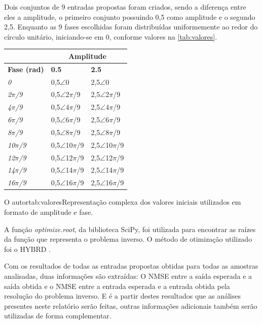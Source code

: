 Dois conjuntos de 9 entradas propostas foram criados, sendo a diferença entre eles a amplitude, o primeiro conjunto possuindo 0,5 como amplitude e o segundo 2,5. Enquanto as 9 fases escolhidas foram distribuídas uniformemente ao redor do círculo unitário, iniciando-se em 0, conforme valores na \autoref{tab:valores}.
{
\begin{tabular}{l|l|l}
\hline
    & \multicolumn{2}{c}{\textbf{Amplitude}} \\ \hline
    \textbf{Fase (rad)} & \textbf{0.5} & \textbf{2.5} \\ \hline
    \textit{0}& 0,5$\angle$0 & 2,5$\angle$0 \\ \hline
    \textit{2$\pi$/9} & 0,5$\angle$2$\pi$/9  & 2,5$\angle$2$\pi$/9  \\ \hline
    \textit{4$\pi$/9} & 0,5$\angle$4$\pi$/9  & 2,5$\angle$4$\pi$/9  \\ \hline
    \textit{6$\pi$/9} & 0,5$\angle$6$\pi$/9  & 2,5$\angle$6$\pi$/9  \\ \hline
    \textit{8$\pi$/9} & 0,5$\angle$8$\pi$/9  & 2,5$\angle$8$\pi$/9  \\ \hline
    \textit{10$\pi$/9}& 0,5$\angle$10$\pi$/9 & 2,5$\angle$10$\pi$/9 \\ \hline
    \textit{12$\pi$/9}& 0,5$\angle$12$\pi$/9 & 2,5$\angle$12$\pi$/9 \\ \hline
    \textit{14$\pi$/9}& 0,5$\angle$14$\pi$/9 & 2,5$\angle$14$\pi$/9 \\ \hline
    \textit{16$\pi$/9}& 0,5$\angle$16$\pi$/9 & 2,5$\angle$16$\pi$/9 \\ \hline
\end{tabular}
\label{tab:valores}
}
{O autor}{tab:valores}{}{Representação complexa dos valores iniciais utilizados em formato de amplitude e fase.}

A função \textit{optimize.root}, da biblioteca SciPy, foi utilizada para encontrar as raízes da função que representa o problema inverso. O método de otimização utilizado foi o HYBRD \cite{powell1970hybrid}.

Com os resultados de todas as entradas propostas obtidas para todas as amostras analisadas, duas informações são extraídas: O NMSE entre a saída esperada e a saída obtida e o NMSE entre a entrada esperada e a entrada obtida pela resolução do problema inverso. E é a partir destes resultados que as análises presentes neste relatório serão feitas, outras informações adicionais também serão utilizadas de forma complementar.

